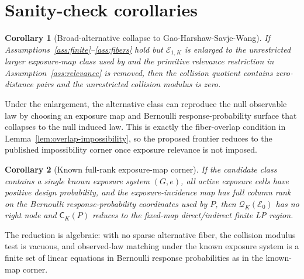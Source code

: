 \documentclass[11pt]{article}
\theoremstyle{definition}
\theoremstyle{plain}
\newtheorem{corollary}{Corollary}
\theoremstyle{remark}
\begin{document}
\section{Sanity-check corollaries}
\begin{corollary}[Broad-alternative collapse to Gao-Harshaw-Savje-Wang]\label{cor:gao}
If Assumptions~\ref{ass:finite}--\ref{ass:fibers} hold but \(\mathcal E_{1,K}\) is enlarged to the unrestricted larger exposure-map class used by \citet{GaoHarshawSavjeWang2026} and the primitive relevance restriction in Assumption~\ref{ass:relevance} is removed, then the collision quotient contains zero-distance pairs and the unrestricted collision modulus is zero.
\end{corollary}
Under the enlargement, the alternative class can reproduce the null observable law by choosing an exposure map and Bernoulli response-probability surface that collapses to the null induced law.  This is exactly the fiber-overlap condition in Lemma~\ref{lem:overlap-impossibility}, so the proposed frontier reduces to the published impossibility corner once exposure relevance is not imposed.

\begin{corollary}[Known full-rank exposure-map corner]\label{cor:known-map}
If the candidate class contains a single known exposure system \((G,e)\), all active exposure cells have positive design probability, and the exposure-incidence map has full column rank on the Bernoulli response-probability coordinates used by \(P\), then \(\mathcal Q_K(\mathcal E_0)\) has no right node and \(\mathsf C_K(P)\) reduces to the fixed-map direct/indirect finite LP region.
\end{corollary}
The reduction is algebraic: with no sparse alternative fiber, the collision modulus test is vacuous, and observed-law matching under the known exposure system is a finite set of linear equations in Bernoulli response probabilities as in the \citet{AronowSamii2017} known-map corner.
\end{document}
